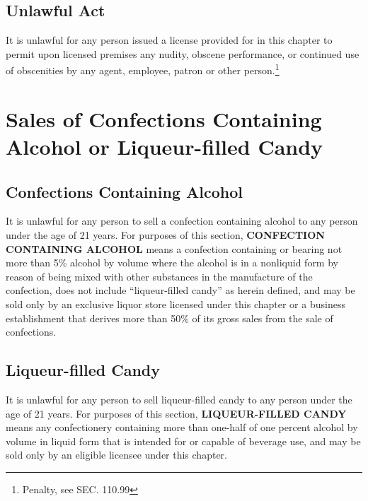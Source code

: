 \subsection{Unlawful Act}
It is unlawful for any person issued a license provided for in this chapter to permit upon licensed premises any nudity, obscene performance, or continued use of obscenities by any agent, employee, patron or other person.\footnote{Penalty, see SEC. 110.99}

\section{Sales of Confections Containing Alcohol or Liqueur-filled Candy}
\subsection{Confections Containing Alcohol}
It is unlawful for any person to sell a confection containing alcohol to any person under the age of 21 years.  For purposes of this section, \textbf{CONFECTION CONTAINING ALCOHOL} means a confection containing or bearing not more than 5\% alcohol by volume where the alcohol is in a nonliquid form by reason of being mixed with other substances in the manufacture of the confection, does not include “liqueur-filled candy” as herein defined, and may be sold only by an exclusive liquor store licensed under this chapter or a business establishment that derives more than 50\% of its gross sales from the sale of confections.
\subsection{Liqueur-filled Candy}
It is unlawful for any person to sell liqueur-filled candy to any person under the age of 21 years.  For purposes of this section, \textbf{LIQUEUR-FILLED CANDY} means any confectionery containing more than one-half of one percent alcohol by volume in liquid form that is intended for or capable of beverage use, and may be sold only by an eligible licensee under this chapter.\\


\setcounter{section}{59}
